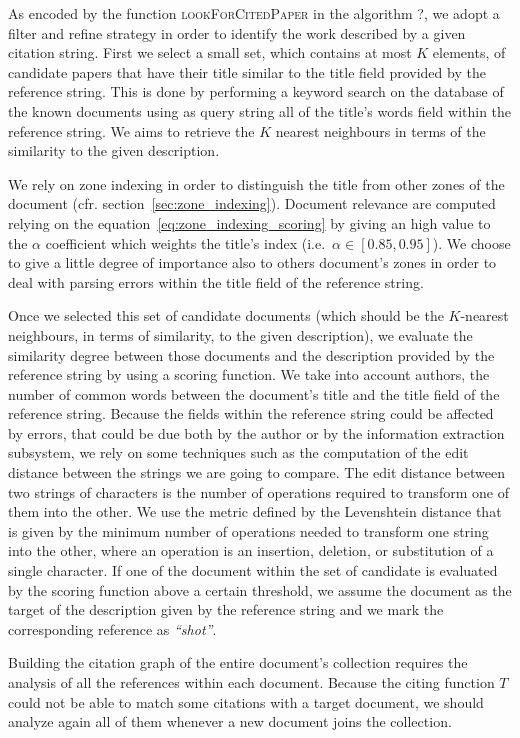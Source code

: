 As encoded by the function \textsc{lookForCitedPaper} in the algorithm ?, we adopt a filter and refine strategy in order to identify the work described by a given citation string. First we select a small set, which contains at most $K$ elements, of candidate papers that have their title similar to the title field provided by the reference string. This is done by performing a keyword search on the database of the known documents using as query string all of the title's words field within the reference string. We aims to retrieve the $K$ nearest neighbours in terms of the similarity to the given description.

We rely on zone indexing in order to distinguish the title from other zones of the document (cfr. section~\ref{sec:zone_indexing}). Document relevance are computed relying on the equation~\ref{eq:zone_indexing_scoring} by giving an high value to the $\alpha$ coefficient which weights the title's index (i.e.\ $\alpha \in \left[0.85, 0.95\right]$). We choose to give a little degree of importance also to others document's zones in order to deal with parsing errors within the title field of the reference string.

Once we selected this set of candidate documents (which should be the $K$-nearest neighbours, in terms of similarity, to the given description), we evaluate the similarity degree between those documents and the description provided by the reference string by using a scoring function. We take into account authors, the number of common words between the document's title and the title field of the reference string. Because the fields within the reference string could be affected by errors, that could be due both by the author or by the information extraction subsystem, we rely on some techniques such as the computation of the edit distance between the strings we are going to compare. The edit distance between two strings of characters is the number of operations required to transform one of them into the other. We use the metric defined by the Levenshtein distance that is given by the minimum number of operations needed to transform one string into the other, where an operation is an insertion, deletion, or substitution of a single character. If one of the document within the set of candidate is evaluated by the scoring function above a certain threshold, we assume the document as the target of the description given by the reference string and we mark the corresponding reference as \emph{``shot''}.

Building the citation graph of the entire document's collection requires the analysis of all the references within each document. Because the citing function $T$ could not be able to match some citations with a target document, we should analyze again all of them whenever a new document joins the collection.

